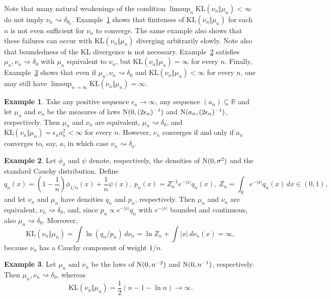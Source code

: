 \documentclass[11pt]{article}
\theoremstyle{plain}
\theoremstyle{definition}
\newtheorem{example}{Example}
\theoremstyle{remark}
\begin{document}
Note that many natural weakenings of the condition $\limsup_{n}\mathrm{KL}(\nu_{n}\Vert\mu_{n})<\infty$
do not imply $\nu_{n}\rightsquigarrow\delta_{\theta_{0}}$.
Example~\ref{ex:1-better} shows that finiteness of  $\mathrm{KL}(\nu_{n}\Vert\mu_{n})$ for each
$n$ is not even sufficient for $\nu_n$ to converge.
The same example also shows that these failures can occur with $\mathrm{KL}(\nu_{n}\Vert\mu_{n})$ diverging arbitrarily slowly.
Note also that boundedness of the KL divergence is not necessary.
Example~\ref{ex:2}
satisfies $\mu_{n},\nu_{n}\rightsquigarrow\delta_{0}$ with $\mu_n$ equivalent to $\nu_n$, but $\mathrm{KL}(\nu_{n}\Vert\mu_{n})=\infty$
for every $n$.
Finally, Example~\ref{ex:3} shows that even if $\mu_{n},\nu_{n}\rightsquigarrow\delta_{0}$ and
$\mathrm{KL}(\nu_{n}\Vert\mu_{n})<\infty$ for every $n$, one may
still have $\limsup_{n\to\infty}\mathrm{KL}(\nu_{n}\Vert\mu_{n})=\infty$.





\begin{example}\label{ex:1-better}
Take any positive sequence $\epsilon_{n}\to\infty$, any sequence $(a_n)\subseteq \mathbb R$ and let $\mu_{n}$
and $\nu_{n}$ be the measures of laws ${\rm N}(0,(2\epsilon_{n})^{-1})$ and
${\rm N}(a_n,(2\epsilon_{n})^{-1})$, respectively. Then $\mu_{n}$ and $\nu_{n}$ are equivalent, $\mu_{n}\rightsquigarrow\delta_{0}$,
and $\mathrm{KL}(\nu_{n}\Vert\mu_{n})=\epsilon_{n}a_n^2<\infty$ for every $n$.
However, $\nu_{n}$ converges if and only if $a_n$ converges to, say, $a$, in which case $\nu_n \rightsquigarrow \delta_a$.

\end{example}


\begin{example} \label{ex:2}
Let $\phi_{\sigma}$ and $\psi$ denote, respectively, the densities of ${\rm N}(0,\sigma^{2})$ and the standard Cauchy distribution. Define
\[
q_{n}(x)=\left(1-\frac{1}{n}\right)\phi_{1/n}(x)+\frac{1}{n}\psi(x),\  p_{n}(x)=Z_{n}^{-1}e^{-|x|}q_{n}(x),\  Z_{n}=\int_{\mathbb{R}}e^{-|x|}q_{n}(x)\,dx\in(0,1),
\]
and let $\nu_{n}$ and $\mu_{n}$ have densities $q_{n}$ and $p_{n}$,
respectively. Then $\mu_{n}$ and $\nu_{n}$ are equivalent, $\nu_{n}\rightsquigarrow\delta_{0}$,
and, since $p_{n}\propto e^{-|x|}q_{n}$ with $e^{-|x|}$ bounded
and continuous, also $\mu_{n}\rightsquigarrow\delta_{0}$. Moreover,
\[
\mathrm{KL}(\nu_{n}\Vert\mu_{n})=\int\ln\!\left({q_{n}}/{p_{n}}\right)\,d\nu_{n}=\ln Z_{n}+\int|x|\,d\nu_{n}(x)=\infty,
\]
because $\nu_{n}$ has a Cauchy component of weight $1/n$.
\end{example}
\begin{example}\label{ex:3}
Let $\mu_{n}$ and $\nu_{n}$ be the laws of ${\rm N}(0,n^{-2})$
and ${\rm N}(0,n^{-1})$, respectively. Then $\mu_{n},\nu_{n}\rightsquigarrow\delta_{0}$,
whereas
\[
\mathrm{KL}(\nu_{n}\Vert\mu_{n})=\frac{1}{2}\left(n-1-\ln n\right)\to\infty.
\]
\end{example}
\end{document}
